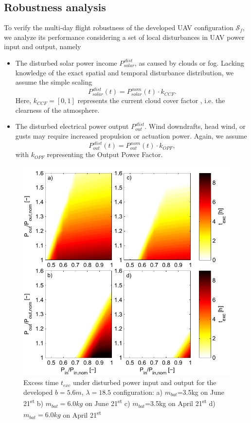\subsection{Robustness analysis}
To verify the multi-day flight robustness of the developed UAV configuration $\mathcal{S}_f$, we analyze its performance considering a set of local disturbances in UAV power input and output, namely
\begin{itemize}
\item The disturbed solar power income $P_{solar}^{\,dist}$, as caused by clouds or fog. Lacking knowledge of the exact spatial and temporal disturbance distribution, we assume the simple scaling
\begin{equation}
P_{solar}^{\,dist}(t) = P_{solar}^{\,nom}(t) \cdot k_{CCF}.
\end{equation}
Here, $k_{CCF}=[0,1]$  represents the current cloud cover factor \cite{Kimura_SolarRadAndClouds}, i.e. the clearness of the atmosphere.
\item The disturbed electrical power output $P_{out}^{\,dist}$. Wind downdrafts, head wind, or gusts may require increased propulsion or actuation power. Again, we assume 
\begin{equation}
P_{out}^{\,dist}(t) = P_{out}^{\,nom}(t) \cdot k_{OPF},
\end{equation}
with $k_{OPF}$ representing the Output Power Factor.
\end{itemize}
\begin{figure}
    \centering
    \includegraphics[width=\linewidth]{images/5_texcRobustness}
    \caption{Excess time $t_{exc}$ under disturbed power input and output for the developed $b=5.6m$, $\lambda=18.5$ configuration: a) $m_{bat}$=3.5kg on June 21\textsuperscript{st} b) $m_{bat}=6.0kg$ on June 21\textsuperscript{st} c) $m_{bat}$=3.5kg on April 21\textsuperscript{st} d) $m_{bat}=6.0kg$ on April 21\textsuperscript{st} }
    \label{fig:ExcessTimeRobustness}
\end{figure}
